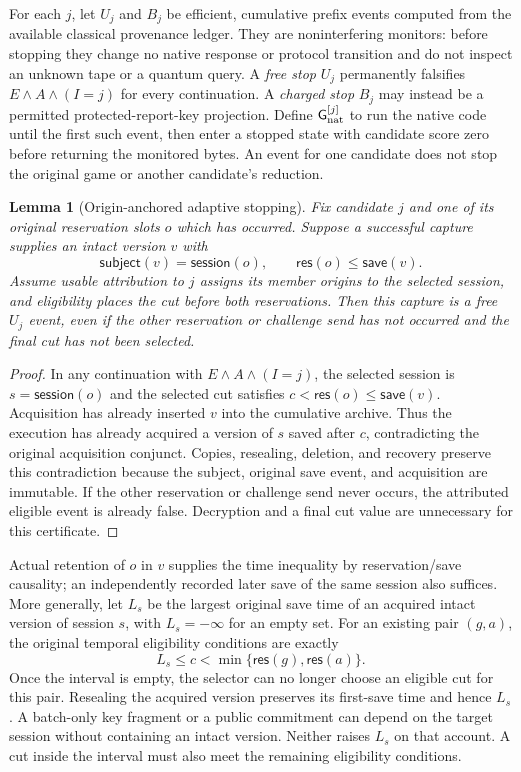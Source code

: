 \documentclass[pdflatex]{sn-jnl}
\theoremstyle{thmstyleone}
\newtheorem{lemma}[theorem]{Lemma}
\theoremstyle{thmstylethree}
\theoremstyle{thmstyletwo}
\begin{document}
For each $j$, let $U_j$ and $B_j$ be efficient, cumulative prefix events
computed from the available classical provenance ledger.  They are
noninterfering monitors: before stopping they change no native response or
protocol transition and do not inspect an unknown tape or a quantum query.
A \emph{free stop} $U_j$ permanently falsifies $E\land A\land(I=j)$ for every
continuation.  A \emph{charged stop} $B_j$ may instead be a permitted
protected-report-key projection.  Define $\mathsf G_{\rm nat}^{[j]}$ to run
the native code until the first such event, then enter a stopped state with
candidate score zero before returning the monitored bytes.  An event for one
candidate does not stop the original game or another candidate's reduction.

\begin{lemma}[Origin-anchored adaptive stopping]
\label{lem:adaptive-origin-stop}
Fix candidate $j$ and one of its original reservation slots $o$ which has
occurred.  Suppose a successful capture supplies an intact version $v$ with
\[
 \mathsf{subject}(v)=\mathsf{session}(o),\qquad
 \mathsf{res}(o)\le\mathsf{save}(v).
\]
Assume usable attribution to $j$ assigns its member origins to the selected
session, and eligibility places the cut before both reservations.  Then this
capture is a free $U_j$ event, even if the other reservation or challenge send
has not occurred and the final cut has not been selected.
\end{lemma}
\begin{proof}
In any continuation with $E\land A\land(I=j)$, the selected session is
$s=\mathsf{session}(o)$ and the selected cut satisfies
$c<\mathsf{res}(o)\le\mathsf{save}(v)$.  Acquisition has already inserted
$v$ into the cumulative archive. Thus the execution has already acquired a
version of $s$ saved after $c$, contradicting the original acquisition conjunct.
Copies, resealing, deletion, and recovery preserve this contradiction because
the subject, original save event, and acquisition are immutable.  If the other
reservation or challenge send never occurs, the attributed eligible event is
already false.  Decryption and a final cut value are unnecessary for this
certificate.
\end{proof}

Actual retention of $o$ in $v$ supplies the time inequality by reservation/save
causality; an independently recorded later save of the same session also
suffices.  More generally, let $L_s$ be the largest original save time of an
acquired intact version of session $s$, with $L_s=-\infty$ for an empty set.
For an existing pair $(g,a)$, the original temporal eligibility conditions are
exactly
\[
       L_s\le c<\min\{\mathsf{res}(g),\mathsf{res}(a)\}.
\]
Once the interval is empty, the selector can no longer choose an
eligible cut for this pair. Resealing the acquired version preserves
its first-save time and hence $L_s$. A batch-only key fragment or a
public commitment can depend on the target session without containing
an intact version. Neither raises $L_s$ on that account. A cut inside
the interval must also meet the remaining eligibility conditions.
\end{document}
